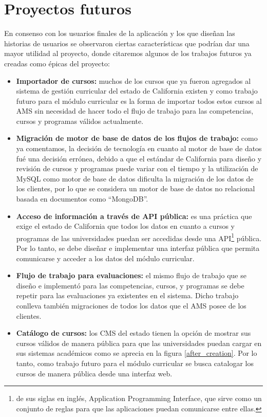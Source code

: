 \section{Proyectos futuros}
En consenso con los usuarios finales de la aplicación y los que diseñan las historias de usuarios se observaron ciertas características que podrían dar una mayor utilidad al proyecto, donde citaremos algunos de los trabajos futuros ya creadas como épicas del proyecto:
\begin{itemize}
	\item \textbf{Importador de cursos:} muchos de los cursos que ya fueron agregados al sistema de gestión curricular del estado de California existen y como trabajo futuro para el módulo curricular es la forma de importar todos estos cursos al AMS sin necesidad de hacer todo el flujo de trabajo para las competencias, cursos y programas válidos actualmente.
	\item \textbf{Migración de motor de base de datos de los flujos de trabajo:} como ya comentamos, la decisión de tecnología en cuanto al motor de base de datos fué una decisión errónea, debido a que el estándar de California para diseño y revisión de cursos y programas puede variar con el tiempo y la utilización de MySQL como motor de base de datos dificulta la migración de los datos de los clientes, por lo que se considera un motor de base de datos no relacional basada en documentos como \enquote{MongoDB}.
	\item \textbf{Acceso de información a través de API pública:} es una práctica que exige el estado de California que todos los datos en cuanto a cursos y programas de las universidades puedan ser accedidas desde una API\footnote{de sus siglas en inglés, Application Programming Interface, que sirve como un conjunto de reglas para que las aplicaciones puedan comunicarse entre ellas.} pública. Por lo tanto, se debe diseñar e implementar una interfaz pública que permita comunicarse y acceder a los datos del módulo curricular.
	\item \textbf{Flujo de trabajo para evaluaciones:} el mismo flujo de trabajo que se diseño e implementó para las competencias, cursos, y programas se debe repetir para las evaluaciones ya existentes en el sistema. Dicho trabajo conlleva también migraciones de todos los datos que el AMS posee de los clientes.
	\item \textbf{Catálogo de cursos:} los CMS del estado tienen la opción de mostrar sus cursos válidos de manera pública para que las universidades puedan cargar en sus sistemas académicos como se aprecia en la figura \ref{after_creation}. Por lo tanto, como trabajo futuro para el módulo curricular se busca catalogar los cursos de manera pública desde una interfaz web.
\end{itemize}